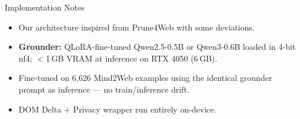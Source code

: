 \begin{frame}{Implementation Notes}
  \begin{itemize}
    \item Our architecture inspired from Prune4Web with some deviations.

    \item \textbf{Grounder:} QLoRA-fine-tuned Qwen2.5-0.5B or Qwen3-0.6B loaded in 4-bit nf4; $<$1\,GB VRAM at inference on RTX 4050 (6\,GB).

    \item Fine-tuned on 6,626 Mind2Web examples using the identical grounder prompt as inference --- no train/inference drift.

    \item DOM Delta + Privacy wrapper run entirely on-device.
  \end{itemize}
\end{frame}

